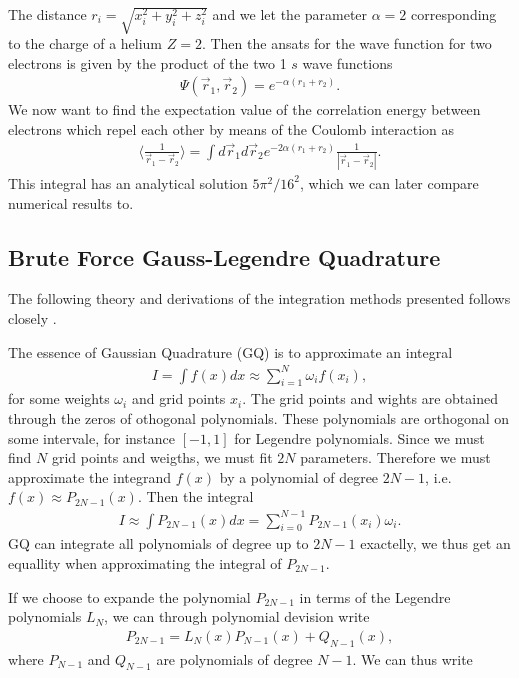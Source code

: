 \documentclass[10pt, twocolumn]{aastex62}
\begin{document}
The distance $r_i = \sqrt{x_i^2 + y_i^2 + z_i^2}$ and we let the parameter
$\alpha = 2$ corresponding to the charge of a helium $Z = 2$. Then the ansats
for the wave function for two electrons is given by the product of the two 1 $s$
wave functions 
\begin{align}
	\Psi(\vec{r}_1, \vec{r}_2) = e^{-\alpha(r_1 + r_2)}.
\end{align}
We now want to find the expectation value of the correlation energy between
electrons which repel each other by means of the Coulomb interaction as 
\begin{align}
\langle \frac{
1}{\vec{r}_1 - \vec{r}_2}\rangle = \int d\vec{r}_1d\vec{r}_2 e^{-2\alpha(r_1 + r_2)}\frac{1}{|\vec{r}_1 - \vec{r}_2|}.
\label{eq:integral}
\end{align}
This integral has an analytical solution $5\pi^2/16^2$, which we can later
compare numerical results to.
\subsection{Brute Force Gauss-Legendre Quadrature}\label{subsec:brute_force_gauss}
The following theory and derivations of the integration methods presented
follows closely \citep[Ch. 5.3]{jensen:2015}. 

The essence of Gaussian Quadrature (GQ) is to approximate an integral 
\begin{align}
	I = \int f(x) dx \approx \sum^N_{i = 1} \omega_i f(x_i),
	\label{eq:quadrature}
\end{align} 
for some weights $\omega_i$ and grid points $x_i$. The grid points and wights
are obtained through the zeros of othogonal polynomials. These polynomials are
orthogonal on some intervale, for instance $[-1, 1]$ for Legendre polynomials.
Since we must find $N$ grid points and weigths, we must fit $2N$ parameters.
Therefore we must approximate the integrand $f(x)$ by a polynomial of degree
$2N-1$, i.e. $f(x) \approx P_{2N-1}(x)$. Then the integral 
\begin{align}
	I \approx \int P_{2N-1}(x)dx = \sum^{N-1}_{i=0}P_{2N-1}(x_i) \omega_i.
\end{align} 
GQ can integrate all polynomials of degree up to $2N-1$ exactelly, we thus get
an equallity when approximating the integral of $P_{2N-1}$. 

If we choose to expande the polynomial $P_{2N-1}$ in terms of the Legendre
polynomials $L_N$, we can through polynomial devision write 
\begin{align}
	P_{2N-1} = L_N(x)P_{N-1}(x) + Q_{N-1}(x),
\end{align}
where $P_{N-1}$ and $Q_{N-1}$ are polynomials of degree $N-1$. We can thus write
\end{document}
